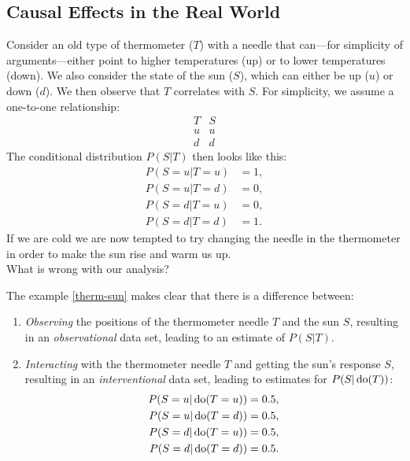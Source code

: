 




\subsection{Causal Effects in the Real World}

\begin{Eg}
    \label{therm-sun}
    Consider an old type of thermometer ($T$) with a needle that can---for simplicity of arguments---either point to higher temperatures (up) or to lower temperatures (down).
    We also consider the state of the sun ($S$), which can either be up ($u$) or down ($d$).
    We then observe that $T$ correlates with $S$. For simplicity, we assume a one-to-one relationship:
    \[\begin{array}{c|c} 
        T & S \\ 
        \hline
        u & u \\
        d & d
    \end{array}\]
    The conditional distribution $P(S|T)$ then looks like this:
    \begin{align*}
        P(S=u|T=u) & = 1, \\
        P(S=u|T=d) & = 0, \\
        P(S=d|T=u) & = 0, \\
        P(S=d|T=d) & = 1.
    \end{align*}
    If we are cold we are now tempted to try changing the needle in the thermometer in order to make the sun rise and warm us up.\\
What is wrong with our analysis?
\end{Eg}

\begin{Disc}
    The example \ref{therm-sun} makes clear that there is a difference between:
    \begin{enumerate}
        \item \emph{Observing} the positions of the thermometer needle $T$ and the sun $S$, resulting in an \emph{observational} data set, 
            leading to an estimate of $P(S|T)$.
        \item \emph{Interacting} with the thermometer needle $T$ and getting the sun's response $S$, resulting in an \emph{interventional} data set, leading to estimates for $P(S|\operatorname{do}(T))$:
                \begin{align*}
                    P(S=u|\operatorname{do}(T=u)) & = 0.5, \\
                    P(S=u|\operatorname{do}(T=d)) & = 0.5, \\
                    P(S=d|\operatorname{do}(T=u)) & = 0.5, \\
                    P(S=d|\operatorname{do}(T=d)) & = 0.5.
    \end{align*}
    \end{enumerate}
\end{Disc}

